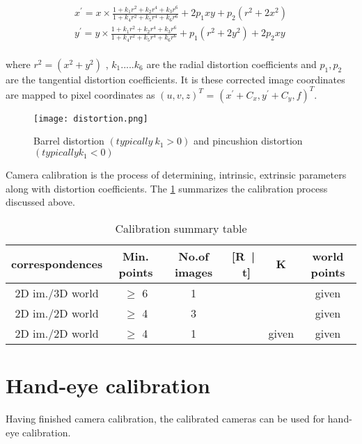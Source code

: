 \begin{equation}
\begin{split}
x^{'} = x \times \frac{1+k_1r^2+k_2r^4+k_3r^6}{1+k_4r^2+k_5r^4+k_6r^6} + 2p_1xy + p_2(r^2+2x^2)\\
y^{'} = y \times \frac{1+k_1r^2+k_2r^4+k_3r^6}{1+k_4r^2+k_5r^4+k_6r^6} + p_1(r^2+2y^2) + 2p_2xy\\ 
\end{split}	
\label{eq:lens_distortion}
\end{equation}

\noindent where $ r^2 = (x^2+y^2) $ , $ k_1 .....k_6 $ are the radial distortion coefficients and  $ p_1, p_2 $ are the tangential distortion coefficients. It is these corrected image coordinates are mapped to pixel coordinates as \( (u, v, z)^T \) = \( ( x^{'} +C_x, y^{'} +C_y, \textit{f} )^T \).

\begin{figure}[hbt!]
	\centering
	\texttt{[image: distortion.png]}
	\caption{Barrel distortion $(typically \ k_1 > 0 )$ and pincushion distortion $(typically k_1 < 0)$ \cite{OpenCV}} 
	\label{fig:distortion}
\end{figure}
\newpage
Camera calibration is the process of determining, intrinsic, extrinsic parameters along with distortion coefficients. The \cref{tab:Calibration_summary_table} summarizes the calibration process discussed above. 

\begin{table}[hbt!]
	\centering
	\begin{tabular}{|cccccc|}
		\hline
		correspondences & Min. points & No.of images & [R\ |\ t] & K & world points\\ 
		\hline
		2D im./3D world & $\geq$ 6 & 1 & \checkmark & \checkmark & given \\
		2D im./2D world & $\geq$ 4 & 3 & \checkmark & \checkmark  & given \\
		2D im./2D world & $\geq$ 4 & 1 & \checkmark  & given & given \\
		\hline
	\end{tabular}
	\caption{Calibration summary table}
	\label{tab:Calibration_summary_table}
\end{table}

\section{Hand-eye calibration}

Having finished camera calibration, the calibrated cameras can be used for hand-eye calibration.


